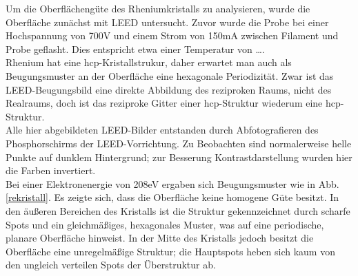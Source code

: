 \FloatBarrier

Um die Oberflächengüte des Rheniumkristalls zu analysieren, wurde die Oberfläche zunächst mit LEED
untersucht. Zuvor wurde die Probe bei einer Hochspannung von 700V und einem Strom
von 150mA zwischen Filament und Probe geflasht. Dies entspricht etwa einer Temperatur von \ldots.\\
Rhenium hat eine hcp-Kristallstrukur, daher erwartet man auch als Beugungsmuster an der Oberfläche
eine hexagonale Periodizität. Zwar ist das LEED-Beugungsbild eine direkte Abbildung des reziproken
Raums, nicht des Realraums, doch ist das reziproke Gitter einer hcp-Struktur wiederum eine
hcp-Struktur.\\
Alle hier abgebildeten LEED-Bilder entstanden durch Abfotografieren des Phosphorschirms der
LEED-Vorrichtung. Zu Beobachten sind normalerweise helle Punkte auf dunklem Hintergrund; zur
Besserung Kontrastdarstellung wurden hier die Farben invertiert.\\
Bei einer Elektronenergie von 208eV ergaben sich Beugungsmuster wie in Abb. \ref{rekristall}. Es
zeigte sich, dass die Oberfläche keine homogene Güte besitzt. In den äußeren Bereichen des
Kristalls ist die Struktur gekennzeichnet durch scharfe Spots und ein gleichmäßiges, hexagonales
Muster, was auf eine periodische, planare Oberfläche hinweist. In der Mitte des Kristalls jedoch
besitzt die Oberfläche eine unregelmäßige Struktur; die Hauptspots heben sich kaum von den ungleich
verteilen Spots der Überstruktur ab.

